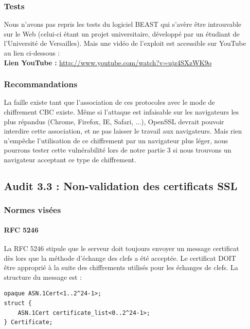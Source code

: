 \subsubsection{Tests}

Nous n'avons pas repris les tests du logiciel BEAST qui s'avère être introuvable sur le Web (celui-ci étant un projet universitaire, développé par un étudiant de l'Université de Versailles). Mais une vidéo de l'exploit est accessible sur YouTube au lien ci-dessous : \\

\textbf{Lien YouTube : } \href{http://www.youtube.com/watch?v=ujz4SXzWK9o} {http://www.youtube.com/watch?v=ujz4SXzWK9o}

\subsubsection{Recommandations}

La faille existe tant que l'association de ces protocoles avec le mode de chiffrement CBC existe. Même si l'attaque est infaisable sur les navigateurs les plus répandus (Chrome, Firefox, IE, Safari, ...), OpenSSL devrait pouvoir interdire cette association, et ne pas laisser le travail aux navigateurs. Mais rien n'empêche l'utilisation de ce chiffrement par un navigateur plus léger, nous pourrons tester cette vulnérabilité lors de notre partie 3 si nous trouvons un navigateur acceptant ce type de chiffrement.

\subsection{Audit 3.3 : Non-validation des certificats SSL}
\subsubsection{Normes visées}

\paragraph{RFC 5246 \\}
La RFC 5246 \cite{rfc5246} stipule que le serveur doit toujours envoyer un message certificat dès lors que la méthode d'échange des clefs a été acceptée. 
Le certificat DOIT être approprié à la suite des chiffrements utilisés pour les échanges de clefs.
La structure du message est : 

\begin{verbatim} 
opaque ASN.1Cert<1..2^24-1>;
struct {
    ASN.1Cert certificate_list<0..2^24-1>;
} Certificate;
\end{verbatim}

